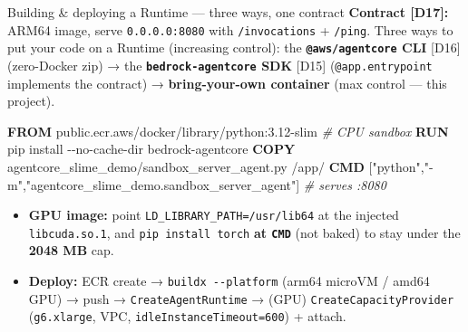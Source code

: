 \documentclass[
  10pt,
  ignorenonframetext,
  aspectratio=169,
  t]{beamer}
\newenvironment{Shaded}{}{}
\newcommand{\AttributeTok}[1]{\textcolor[rgb]{0.49,0.56,0.16}{#1}}
\newcommand{\CommentTok}[1]{\textcolor[rgb]{0.38,0.63,0.69}{\textit{#1}}}
\newcommand{\ExtensionTok}[1]{#1}
\newcommand{\KeywordTok}[1]{\textcolor[rgb]{0.00,0.44,0.13}{\textbf{#1}}}
\newcommand{\NormalTok}[1]{#1}
\newcommand{\StringTok}[1]{\textcolor[rgb]{0.25,0.44,0.63}{#1}}
\providecommand{\tightlist}{%
  \setlength{\itemsep}{0pt}\setlength{\parskip}{0pt}}
\begin{document}
\begin{frame}{Building \& deploying a Runtime --- three ways,
one contract}
\protect\hypertarget{building-deploying-a-runtime-three-ways-one-contract}{}
\textbf{Contract {[}D17{]}:} ARM64 image, serve \texttt{0.0.0.0:8080}
with \texttt{/invocations} + \texttt{/ping}. Three ways to put your code
on a Runtime (increasing control): the \textbf{\texttt{@aws/agentcore}
CLI} {[}D16{]} (zero-Docker zip) → the
\textbf{\texttt{bedrock-agentcore} SDK} {[}D15{]}
(\texttt{@app.entrypoint} implements the contract) →
\textbf{bring-your-own container} (max control --- this project).

\begin{Shaded}
\begin{Highlighting}[]
\KeywordTok{FROM}\NormalTok{ public.ecr.aws/docker/library/python:3.12{-}slim   }\CommentTok{\# CPU sandbox}
\KeywordTok{RUN} \ExtensionTok{pip}\NormalTok{ install }\AttributeTok{{-}{-}no{-}cache{-}dir}\NormalTok{ bedrock{-}agentcore}
\KeywordTok{COPY}\NormalTok{ agentcore\_slime\_demo/sandbox\_server\_agent.py /app/}
\KeywordTok{CMD}\NormalTok{ [}\StringTok{"python"}\NormalTok{,}\StringTok{"{-}m"}\NormalTok{,}\StringTok{"agentcore\_slime\_demo.sandbox\_server\_agent"}\NormalTok{]  }\CommentTok{\# serves :8080}
\end{Highlighting}
\end{Shaded}

\begin{itemize}
\tightlist
\item
  \textbf{GPU image:} point \texttt{LD\_LIBRARY\_PATH=/usr/lib64} at the
  injected \texttt{libcuda.so.1}, and \texttt{pip\ install\ torch}
  \textbf{at \texttt{CMD}} (not baked) to stay under the \textbf{2048
  MB} cap.
\item
  \textbf{Deploy:} ECR create → \texttt{buildx\ -\/-platform} (arm64
  microVM / amd64 GPU) → push → \texttt{CreateAgentRuntime} → (GPU)
  \texttt{CreateCapacityProvider} (\texttt{g6.xlarge}, VPC,
  \texttt{idleInstanceTimeout=600}) + attach.
\end{itemize}
\end{frame}
\end{document}
